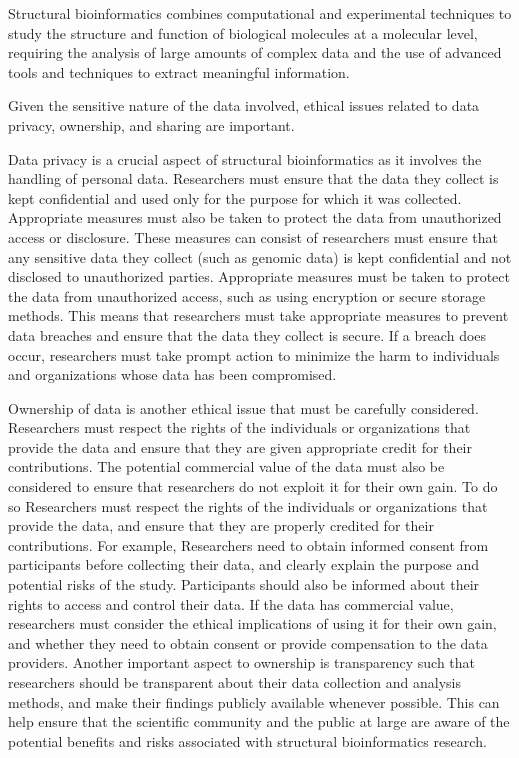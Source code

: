 \documentclass[]{final_report}
\begin{document}
Structural bioinformatics combines computational and experimental techniques to study the structure and function of biological molecules at a molecular level, requiring the analysis of large amounts of complex data and the use of advanced tools and techniques to extract meaningful information.

Given the sensitive nature of the data involved, ethical issues related to data privacy, ownership, and sharing are important. 

Data privacy is a crucial aspect of structural bioinformatics as it involves the handling of personal data. Researchers must ensure that the data they collect is kept confidential and used only for the purpose for which it was collected. Appropriate measures must also be taken to protect the data from unauthorized access or disclosure. These measures can consist of researchers must ensure that any sensitive data they collect (such as genomic data) is kept confidential and not disclosed to unauthorized parties. Appropriate measures must be taken to protect the data from unauthorized access, such as using encryption or secure storage methods. This means that researchers must take appropriate measures to prevent data breaches and ensure that the data they collect is secure. If a breach does occur, researchers must take prompt action to minimize the harm to individuals and organizations whose data has been compromised.



Ownership of data is another ethical issue that must be carefully considered. Researchers must respect the rights of the individuals or organizations that provide the data and ensure that they are given appropriate credit for their contributions. The potential commercial value of the data must also be considered to ensure that researchers do not exploit it for their own gain. To do so Researchers must respect the rights of the individuals or organizations that provide the data, and ensure that they are properly credited for their contributions. For example, Researchers need to obtain informed consent from participants before collecting their data, and clearly explain the purpose and potential risks of the study. Participants should also be informed about their rights to access and control their data. If the data has commercial value, researchers must consider the ethical implications of using it for their own gain, and whether they need to obtain consent or provide compensation to the data providers. Another important aspect to ownership is transparency such that researchers should be transparent about their data collection and analysis methods, and make their findings publicly available whenever possible. This can help ensure that the scientific community and the public at large are aware of the potential benefits and risks associated with structural bioinformatics research.
\end{document}

